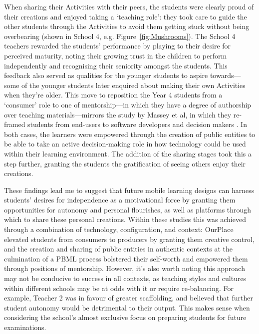 When sharing their Activities with their peers, the students were clearly proud of their creations and enjoyed taking a `teaching role': they took care to guide the other students through the Activities to avoid them getting stuck without being overbearing (shown in School 4, e.g. Figure~\ref{fig:Mushrooms}). The School 4 teachers rewarded the students' performance by playing to their desire for perceived maturity, noting their growing trust in the children to perform independently and recognising their seniority amongst the students. This feedback also served as qualities for the younger students to aspire towards---some of the younger students later enquired about making their own Activities when they're older. This move to reposition the Year 4 students from a `consumer' role to one of mentorship---in which they have a degree of authorship over teaching materials---mirrors the study by Massey et al, in which they re-framed students from end-users to software developers and decision makers \citep{Massey2006}. In both cases, the learners were empowered through the creation of public entities to be able to take an active decision-making role in how technology could be used within their learning environment. The addition of the sharing stages took this a step further, granting the students the gratification of seeing others enjoy their creations.
 
These findings lead me to suggest that future mobile learning designs can harness students' desires for independence as a motivational force by granting them opportunities for autonomy and personal flourishes, as well as platforms through which to share these personal creations. Within these studies this was achieved through a combination of technology, configuration, and context: OurPlace elevated students from consumers to producers by granting them creative control, and the creation and sharing of public entities in authentic contexts at the culmination of a PBML process bolstered their self-worth and empowered them through positions of mentorship. However, it's also worth noting this approach may not be conducive to success in all contexts, as teaching styles and cultures within different schools may be at odds with it or require re-balancing. For example, Teacher 2 was in favour of greater scaffolding, and believed that further student autonomy would be detrimental to their output. This makes sense when considering the school's almost exclusive focus on preparing students for future examinations. 

